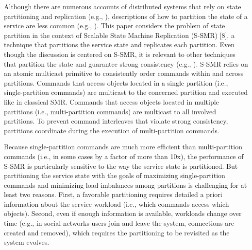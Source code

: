 Although there are numerous accounts of distributed systems that rely on state partitioning and replication (e.g., \cite{x,y,z,w}), descriptions of how to partition the state of a service are less common (e.g., \cite{curino2010sch}).
This paper considers the problem of state partition in the context of Scalable State Machine Replication (S-SMR) [8], a technique that partitions the service state and replicates each partition.
Even though the discussion is centered on S-SMR, it is relevant to other techniques that partition the state and guarantee strong consistency (e.g., \cite{xxx}).
%
%
S-SMR relies on an atomic multicast primitive to consistently order commands within and across partitions. 
Commands that access objects located in a single partition (i.e., single-partition commands) are multicast to the concerned partition and executed like in classical SMR. 
Commands that access objects located in multiple partitions (i.e., multi-partition commands) are multicast to all involved partitions.
To prevent command interleaves that violate strong consistency, partitions coordinate during the execution of multi-partition commands.

Because single-partition commands are much more efficient than multi-partition commands (i.e., in some cases by a factor of more than 10x), the performance of S-SMR is particularly sensitive to the way the service state is partitioned.
But partitioning the service state with the goals of maximizing single-partition commands and minimizing load imbalances among partitions is challenging for at least two reasons.
First, a favorable partitioning requires detailed a priori information about the service workload (i.e., which commands access which objects).
Second, even if enough information is available, workloads change over time (e.g., in social networks users join and leave the system, connections are created and removed), which requires the partitioning to be revisited as the system evolves.

